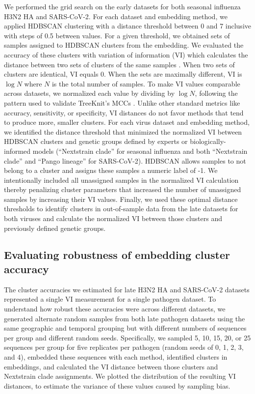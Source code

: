 \documentclass[10pt,letterpaper]{article}
\begin{document}
We performed the grid search on the early datasets for both seasonal influenza H3N2 HA and SARS-CoV-2.
For each dataset and embedding method, we applied HDBSCAN clustering with a distance threshold between 0 and 7 inclusive with steps of 0.5 between values.
For a given threshold, we obtained sets of samples assigned to HDBSCAN clusters from the embedding.
We evaluated the accuracy of these clusters with variation of information (VI) which calculates the distance between two sets of clusters of the same samples \cite{meilua2003comparing}.
When two sets of clusters are identical, VI equals 0.
When the sets are maximally different, VI is $\log{N}$ where $N$ is the total number of samples.
To make VI values comparable across datasets, we normalized each value by dividing by $\log{N}$, following the pattern used to validate TreeKnit's MCCs \cite{Barrat-Charlaix2022}.
Unlike other standard metrics like accuracy, sensitivity, or specificity, VI distances do not favor methods that tend to produce more, smaller clusters.
For each virus dataset and embedding method, we identified the distance threshold that minimized the normalized VI between HDBSCAN clusters and genetic groups defined by experts or biologically-informed models (``Nextstrain clade'' for seasonal influenza and both ``Nextstrain clade'' and ``Pango lineage'' for SARS-CoV-2).
HDBSCAN allows samples to not belong to a cluster and assigns these samples a numeric label of -1.
We intentionally included all unassigned samples in the normalized VI calculation thereby penalizing cluster parameters that increased the number of unassigned samples by increasing their VI values.
Finally, we used these optimal distance thresholds to identify clusters in out-of-sample data from the late datasets for both viruses and calculate the normalized VI between those clusters and previously defined genetic groups.

\subsection*{Evaluating robustness of embedding cluster accuracy}

The cluster accuracies we estimated for late H3N2 HA and SARS-CoV-2 datasets represented a single VI measurement for a single pathogen dataset.
To understand how robust these accuracies were across different datasets, we generated alternate random samples from both late pathogen datasets using the same geographic and temporal grouping but with different numbers of sequences per group and different random seeds.
Specifically, we sampled 5, 10, 15, 20, or 25 sequences per group for five replicates per pathogen (random seeds of 0, 1, 2, 3, and 4), embedded these sequences with each method, identified clusters in embeddings, and calculated the VI distance between those clusters and Nextstrain clade assignments.
We plotted the distribution of the resulting VI distances, to estimate the variance of these values caused by sampling bias.
\end{document}
